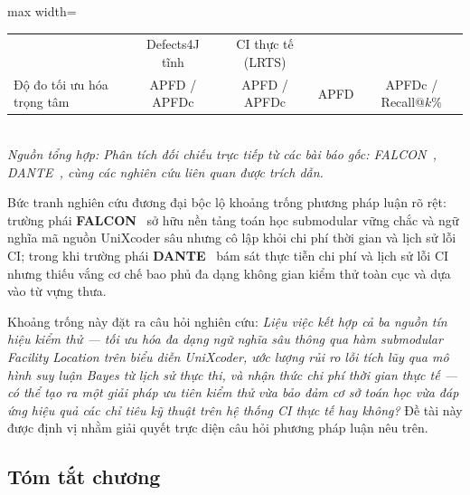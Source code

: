 \begin{table}[H]
\begin{adjustbox}{max width=\textwidth}
\begin{tabular}{lcccc}
& Defects4J tĩnh %
& CI thực tế (LRTS) %
\\
Độ đo tối ưu hóa trọng tâm             
& APFD / APFDc %
& APFD / APFDc %
& APFD %
& APFDc / Recall@$k\%$ %
\\
\bottomrule
\end{tabular}
\end{adjustbox}
\vspace{1mm}\\
\footnotesize{\textit{Nguồn tổng hợp: Phân tích đối chiếu trực tiếp từ các bài báo gốc: FALCON~\cite{falcon2026}, DANTE~\cite{dante2026}, cùng các nghiên cứu liên quan được trích dẫn.}}
\end{table}

Bức tranh nghiên cứu đương đại bộc lộ khoảng trống phương pháp luận rõ rệt: trường phái \textbf{FALCON}~\cite{falcon2026} sở hữu nền tảng toán học submodular vững chắc và ngữ nghĩa mã nguồn UniXcoder sâu nhưng cô lập khỏi chi phí thời gian và lịch sử lỗi CI; trong khi trường phái \textbf{DANTE}~\cite{dante2026} bám sát thực tiễn chi phí và lịch sử lỗi CI nhưng thiếu vắng cơ chế bao phủ đa dạng không gian kiểm thử toàn cục và dựa vào từ vựng thưa.

Khoảng trống này đặt ra câu hỏi nghiên cứu: \textit{Liệu việc kết hợp cả ba nguồn tín hiệu kiểm thử --- tối ưu hóa đa dạng ngữ nghĩa sâu thông qua hàm submodular Facility Location trên biểu diễn UniXcoder, ước lượng rủi ro lỗi tích lũy qua mô hình suy luận Bayes từ lịch sử thực thi, và nhận thức chi phí thời gian thực tế --- có thể tạo ra một giải pháp ưu tiên kiểm thử vừa bảo đảm cơ sở toán học vừa đáp ứng hiệu quả các chỉ tiêu kỹ thuật trên hệ thống CI thực tế hay không?} Đề tài này được định vị nhằm giải quyết trực diện câu hỏi phương pháp luận nêu trên.

\subsection{Tóm tắt chương}
\label{subsec:chapter2_summary}

